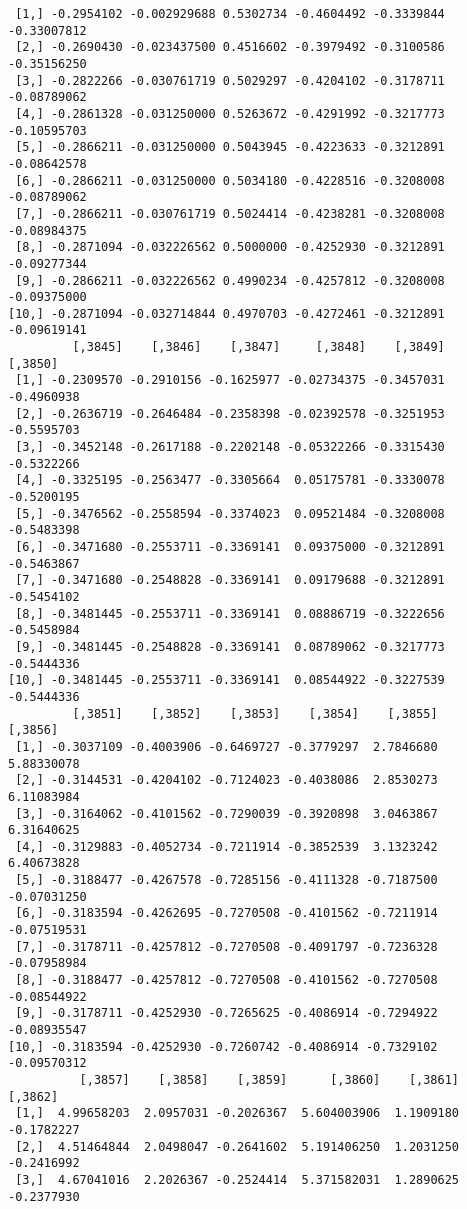 \documentclass[
  letterpaper,
  DIV=11,
  numbers=noendperiod]{scrreprt}
\begin{document}
\begin{verbatim}
 [1,] -0.2954102 -0.002929688 0.5302734 -0.4604492 -0.3339844 -0.33007812
 [2,] -0.2690430 -0.023437500 0.4516602 -0.3979492 -0.3100586 -0.35156250
 [3,] -0.2822266 -0.030761719 0.5029297 -0.4204102 -0.3178711 -0.08789062
 [4,] -0.2861328 -0.031250000 0.5263672 -0.4291992 -0.3217773 -0.10595703
 [5,] -0.2866211 -0.031250000 0.5043945 -0.4223633 -0.3212891 -0.08642578
 [6,] -0.2866211 -0.031250000 0.5034180 -0.4228516 -0.3208008 -0.08789062
 [7,] -0.2866211 -0.030761719 0.5024414 -0.4238281 -0.3208008 -0.08984375
 [8,] -0.2871094 -0.032226562 0.5000000 -0.4252930 -0.3212891 -0.09277344
 [9,] -0.2866211 -0.032226562 0.4990234 -0.4257812 -0.3208008 -0.09375000
[10,] -0.2871094 -0.032714844 0.4970703 -0.4272461 -0.3212891 -0.09619141
         [,3845]    [,3846]    [,3847]     [,3848]    [,3849]    [,3850]
 [1,] -0.2309570 -0.2910156 -0.1625977 -0.02734375 -0.3457031 -0.4960938
 [2,] -0.2636719 -0.2646484 -0.2358398 -0.02392578 -0.3251953 -0.5595703
 [3,] -0.3452148 -0.2617188 -0.2202148 -0.05322266 -0.3315430 -0.5322266
 [4,] -0.3325195 -0.2563477 -0.3305664  0.05175781 -0.3330078 -0.5200195
 [5,] -0.3476562 -0.2558594 -0.3374023  0.09521484 -0.3208008 -0.5483398
 [6,] -0.3471680 -0.2553711 -0.3369141  0.09375000 -0.3212891 -0.5463867
 [7,] -0.3471680 -0.2548828 -0.3369141  0.09179688 -0.3212891 -0.5454102
 [8,] -0.3481445 -0.2553711 -0.3369141  0.08886719 -0.3222656 -0.5458984
 [9,] -0.3481445 -0.2548828 -0.3369141  0.08789062 -0.3217773 -0.5444336
[10,] -0.3481445 -0.2553711 -0.3369141  0.08544922 -0.3227539 -0.5444336
         [,3851]    [,3852]    [,3853]    [,3854]    [,3855]     [,3856]
 [1,] -0.3037109 -0.4003906 -0.6469727 -0.3779297  2.7846680  5.88330078
 [2,] -0.3144531 -0.4204102 -0.7124023 -0.4038086  2.8530273  6.11083984
 [3,] -0.3164062 -0.4101562 -0.7290039 -0.3920898  3.0463867  6.31640625
 [4,] -0.3129883 -0.4052734 -0.7211914 -0.3852539  3.1323242  6.40673828
 [5,] -0.3188477 -0.4267578 -0.7285156 -0.4111328 -0.7187500 -0.07031250
 [6,] -0.3183594 -0.4262695 -0.7270508 -0.4101562 -0.7211914 -0.07519531
 [7,] -0.3178711 -0.4257812 -0.7270508 -0.4091797 -0.7236328 -0.07958984
 [8,] -0.3188477 -0.4257812 -0.7270508 -0.4101562 -0.7270508 -0.08544922
 [9,] -0.3178711 -0.4252930 -0.7265625 -0.4086914 -0.7294922 -0.08935547
[10,] -0.3183594 -0.4252930 -0.7260742 -0.4086914 -0.7329102 -0.09570312
          [,3857]    [,3858]    [,3859]      [,3860]    [,3861]    [,3862]
 [1,]  4.99658203  2.0957031 -0.2026367  5.604003906  1.1909180 -0.1782227
 [2,]  4.51464844  2.0498047 -0.2641602  5.191406250  1.2031250 -0.2416992
 [3,]  4.67041016  2.2026367 -0.2524414  5.371582031  1.2890625 -0.2377930

\end{verbatim}
\end{document}
